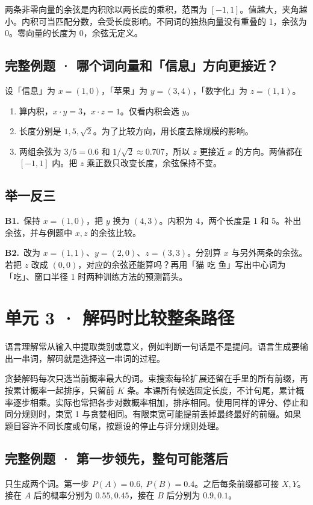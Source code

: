 \documentclass[UTF8,a4paper,11pt]{ctexart}
\newcommand{\PracticeQuestion}[3]{\par\Needspace{4\baselineskip}\noindent\begin{minipage}{\linewidth}\textbf{#1.}\ #2\par\noindent\rule{0pt}{#3mm}\par\end{minipage}\par}
\begin{document}
两条非零向量的余弦是内积除以两长度的乘积，范围为 $[-1,1]$。值越大，夹角越小。内积可当匹配分数，会受长度影响。不同词的独热向量没有重叠的 1，余弦为 0。零向量的长度为 0，余弦无定义。

\subsection{完整例题 · 哪个词向量和「信息」方向更接近？}
设「信息」为 $x=(1,0)$，「苹果」为 $y=(3,4)$，「数字化」为 $z=(1,1)$。

\begin{enumerate}
\item 算内积，$x\cdot y=3$，$x\cdot z=1$。仅看内积会选 $y$。
\item 长度分别是 $1,5,\sqrt2$。为了比较方向，用长度去除规模的影响。
\item 两组余弦为 $3/5=0.6$ 和 $1/\sqrt2\approx0.707$，所以 $z$ 更接近 $x$ 的方向。两值都在 $[-1,1]$ 内。把 $z$ 乘正数只改变长度，余弦保持不变。
\end{enumerate}
\subsection{举一反三}
\PracticeQuestion{B1}{保持 $x=(1,0)$，把 $y$ 换为 $(4,3)$。内积为 4，两个长度是 1 和 5。补出余弦，并与例题中 $x,z$ 的余弦比较。}{24}
\PracticeQuestion{B2}{改为 $x=(1,1)$、$y=(2,0)$、$z=(3,3)$。分别算 $x$ 与另外两条的余弦。若把 $z$ 改成 $(0,0)$，对应的余弦还能算吗？再用「猫 吃 鱼」写出中心词为「吃」、窗口半径 1 时两种训练方法的预测箭头。}{34}
\clearpage
\section{单元 3 · 解码时比较整条路径}
语言理解常从输入中提取类别或意义，例如判断一句话是不是提问。语言生成要输出一串词，解码就是选择这一串词的过程。

贪婪解码每次只选当前概率最大的词。束搜索每轮扩展还留在手里的所有前缀，再按累计概率一起排序，只留前 $K$ 条。本课所有候选固定长度，不计句尾，累计概率逐步相乘。实际也常把各步对数概率相加，排序相同。使用同样的评分、停止和同分规则时，束宽 1 与贪婪相同。有限束宽可能提前丢掉最终最好的前缀。如果题目容许不同长度或句尾，按题设的停止与评分规则处理。

\subsection{完整例题 · 第一步领先，整句可能落后}
只生成两个词。第一步 $P(A)=0.6,\ P(B)=0.4$。之后每条前缀都可接 $X,Y$。接在 $A$ 后的概率分别为 $0.55,0.45$，接在 $B$ 后分别为 $0.9,0.1$。
\end{document}
